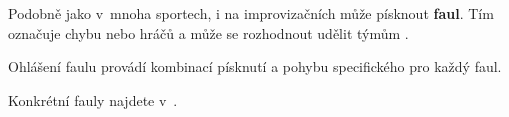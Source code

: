 \needspace{5cm} \label{faul} Podobně jako v~mnoha sportech, i na improvizačních  může  písknout \textbf{faul}. Tím označuje chybu  nebo hráčů a může se rozhodnout udělit týmům . 
 
Ohlášení faulu provádí  kombinací písknutí a pohybu specifického pro každý faul. 
 
Konkrétní fauly najdete v~. 
 
 
